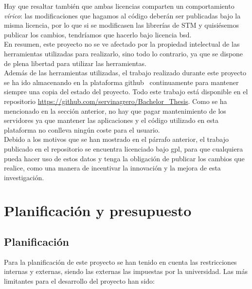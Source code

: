 \documentclass[spanish]{template/minim}
\begin{document}
Hay que resaltar también que ambas licencias comparten un comportamiento \textit{vírico}: las modificaciones que hagamos al código deberán ser publicadas bajo la misma licencia, por lo que si se modificasen las librerías de STM y quisiésemos publicar los cambios, tendríamos que hacerlo bajo licencia \gls{bsd}.\\

En resumen, este proyecto no se ve afectado por la propiedad intelectual de las herramientas utilizadas para realizarlo, sino todo lo contrario, ya que se dispone de plena libertad para utilizar las herramientas.\\

Además de las herramientas utilizadas, el trabajo realizado durante este proyecto se ha ido almacenando en la plataforma github~\cite{github} continuamente para mantener siempre una copia del estado del proyecto. Todo este trabajo está disponible en el repositorio \url{https://github.com/servinagrero/Bachelor_Thesis}. Como se ha mencionado en la sección anterior, no hay que pagar mantenimiento de los servidores ya que mantener las aplicaciones y el código utilizado en esta plataforma no conlleva ningún coste para el usuario.\\

Debido a los motivos que se han mostrado en el párrafo anterior, el trabajo publicado en el repositorio se encuentra licenciado bajo \gls{gpl}, para que cualquiera pueda hacer uso de estos datos y tenga la obligación de publicar los cambios que realice, como una manera de incentivar la innovación y la mejora de esta investigación.\\

\section{Planificación y presupuesto}\label{sec:planning_bill}

\subsection{Planificación}\label{sec:planning}

Para la planificación de este proyecto se han tenido en cuenta las restricciones internas y externas, siendo las externas las impuestas por la universidad. Las más limitantes para el desarrollo del proyecto han sido:
\end{document}
